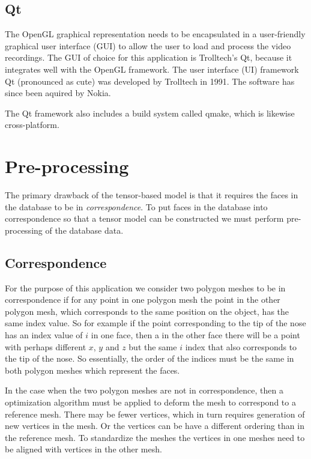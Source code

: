 \documentclass[11pt,a4paper]{report}
\begin{document}
\subsection{Qt}
The OpenGL graphical representation needs to be encapsulated in a user-friendly graphical user
interface (GUI) to allow the user to load and process the video recordings. The GUI
of choice for this application is Trolltech's Qt, because it integrates well
with the OpenGL framework. The user interface (UI) framework Qt (pronounced as cute) was developed by Trolltech in 1991. The
software has since been aquired by Nokia.  
The Qt framework also includes a build system called qmake, which is
likewise cross-platform.

\section{Pre-processing}
The primary drawback of the tensor-based model is that it requires the faces in
the database to be in \textit{correspondence}. To put faces in the database into correspondence
so that a tensor model can be constructed we must perform pre-processing of the
database data.

\subsection{Correspondence}
For the purpose of this application we consider two polygon meshes to be in correspondence
if for any point in one polygon mesh the point in the other polygon mesh, which corresponds to the
same position on the object, has the same index value. So for example if the
point corresponding to the tip of the nose has an index value of $i$ in one
face, then a in the other face there  will be a point with perhaps
different $x$, $y$ and $z$ but the same $i$ index that also corresponds to the
tip of the nose. So essentially, the order of the indices must be the same in both
polygon meshes which represent the faces. 

In the case when the two polygon meshes are not in correspondence, then a
optimization algorithm must be applied to deform the mesh to correspond to a
reference mesh. There may be fewer vertices, which in turn requires
generation of new vertices in the mesh. Or the vertices can be have a different
ordering than in the reference mesh. To standardize the meshes the vertices in
one meshes need to be aligned with vertices in the other mesh. 
\end{document}
